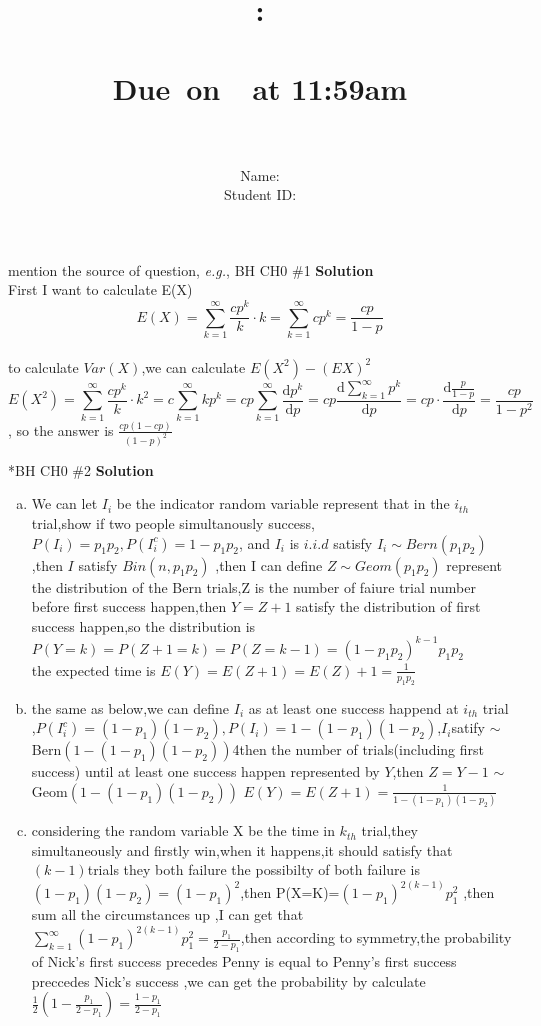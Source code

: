 \documentclass{article}
\title{
    \vspace{2in}
    \textmd{\textbf{\hmwkClass:\\  \hmwkTitle}}\\
    \normalsize\vspace{0.1in}\small{Due\ on\ \hmwkDueDate\ at 11:59am}\\
   \vspace{2in}\Huge{\hmwkClassID}\\   
   \vspace{2in}
}
\author{
	Name: \textbf{\hmwkAuthorName} \\
	Student ID: \hmwkAuthorID}
\date{}
\newcommand{\solution}{\textbf{\Large Solution}}
\begin{document}
\maketitle
\pagebreak

\begin{homeworkProblem}{{\color{blue}mention the source of question}, \textit{e.g.}, BH CH0 \#1}
	\solution
\\	\large{
First I want to calculate E(X)
$$E(X)=\sum_{k=1}^{\infty}\frac{cp^k}{k}\cdot k=\sum_{k=1}^{\infty}cp^k =\frac{cp}{1-p}$$\\
to calculate $Var(X)$,we can calculate $E(X^2)-(EX)^2$
$$E(X^2)=\sum_{k=1}^{\infty}\frac{cp^{k}}{k}\cdot k^2=c\sum_{k=1}^{\infty}kp^k=cp\sum_{k=1}^{\infty}\frac{\mathrm{d}p^k}{\mathrm{d}p}=cp\frac{\mathrm{d}\sum_{k=1}^{\infty}p^k}{\mathrm{d}p}=cp\cdot\frac{\mathrm{d}\frac{p}{1-p}}{\mathrm{d}p}=\frac{cp}{1-p^2}$$,
so the answer is $\frac{cp(1-cp)}{(1-p)^2}$
	}
\end{homeworkProblem}

\begin{homeworkProblem}*{BH CH0 \#2}
\solution\\
\begin{enumerate}[(a)]
\item We can let $I_i$ be the indicator random variable  represent that in the $i_{th}$ trial,show if two people simultanously success,$P(I_i)=p_1p_2,P(I_i^c)=1-p_1p_2$,
and $I_i$ is $i.i.d$ satisfy $I_i\sim Bern(p_1p_2)$,then $I$ satisfy $Bin(n,p_1p_2)$ ,then I can define $Z\sim Geom(p_1p_2)$ represent the distribution of the Bern trials,Z is the number of faiure trial number before first success happen,then $Y=Z+1$ satisfy the distribution of first success happen,so the distribution is $P(Y=k)=P(Z+1=k)=P(Z=k-1)=(1-p_1p_2)^{k-1}p_1p_2$\\
the expected time is $E(Y)=E(Z+1)=E(Z)+1=\frac{1}{p_1p_2}$
\item the same as below,we can define $I_i$ as at least one success happend at $i_{th}$ trial ,$P(I_i^c)=(1-p_1)(1-p_2),P(I_i)=1-(1-p_1)(1-p_2)$,$I_i$satify $\sim$Bern$(1-(1-p_1)(1-p_2))$4then the number of trials(including first success) until at least one success happen represented by $Y$,then $Z=Y-1$ $\sim$ Geom$(1-(1-p_1)(1-p_2))$
$E(Y)=E(Z+1)=\frac{1}{1-(1-p_1)(1-p_2)}$
\item considering the random variable X be the time in $k_{th}$ trial,they simultaneously and firstly win,when it happens,it should satisfy that $(k-1)$trials they both failure the possibilty of both failure is $(1-p_1)(1-p_2)=(1-p_1)^2$,then P(X=K)=$(1-p_1)^{2(k-1)}p_1^2$ ,then sum all the circumstances up ,I can get that $\sum_{k=1}^{\infty}(1-p_1)^{2(k-1)}p_1^2=\frac{p_1}{2-p_1}$,then according to symmetry,the probability of Nick's first success precedes Penny is equal to Penny's first success preccedes Nick's success ,we can get the probability by calculate $\frac{1}{2}(1-\frac{p_1}{2-p_1})=\frac{1-p_1}{2-p_1}$
\end{enumerate}


\end{homeworkProblem}
\end{document}
